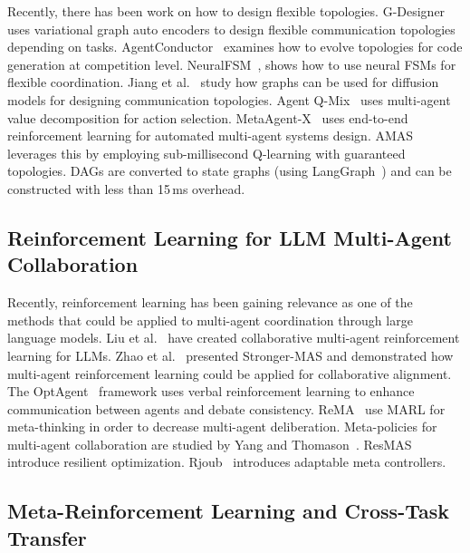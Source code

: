 \documentclass[conference]{IEEEtran}
\begin{document}
Recently, there has been work on how to design flexible topologies. G-Designer~\cite{zhang2025gdesigner} uses variational graph auto encoders to design flexible communication topologies depending on tasks. AgentConductor~\cite{wang2026agentconductor} examines how to evolve topologies for code generation at competition level. NeuralFSM~\cite{wang2026neuralfsm}, shows how to use neural FSMs for flexible coordination. Jiang et al.~\cite{Jiang2026GTD} study how graphs can be used for diffusion models for designing communication topologies. Agent Q-Mix~\cite{jiang2026agentqmix} uses multi-agent value decomposition for action selection. MetaAgent-X~\cite{Zhang2026MetaAgentX} uses end-to-end reinforcement learning for automated multi-agent systems design. AMAS leverages this by employing sub-millisecond Q-learning with guaranteed topologies. DAGs are converted to state graphs (using LangGraph~\cite{langgraph2024}) and can be constructed with less than 15\,ms overhead.

\subsection{Reinforcement Learning for LLM Multi-Agent Collaboration}

Recently, reinforcement learning has been gaining relevance as one of the methods that could be applied to multi-agent coordination through large language models. Liu et al.~\cite{liu2026llm} have created collaborative multi-agent reinforcement learning for LLMs. Zhao et al.~\cite{Zhao2026StrongerMAS} presented Stronger-MAS and demonstrated how multi-agent reinforcement learning could be applied for collaborative alignment. The OptAgent~\cite{bi2025optagent} framework uses verbal reinforcement learning to enhance communication between agents and debate consistency. ReMA~\cite{Wan2025ReMA} use MARL for meta-thinking in order to decrease multi-agent deliberation. Meta-policies for multi-agent collaboration are studied by Yang and Thomason~\cite{Yang2026LearningToDeliberate}. ResMAS~\cite{Zhou2026ResMAS} introduce resilient optimization. Rjoub~\cite{rjoub2026aamc} introduces adaptable meta controllers.

\subsection{Meta-Reinforcement Learning and Cross-Task Transfer}
\end{document}

